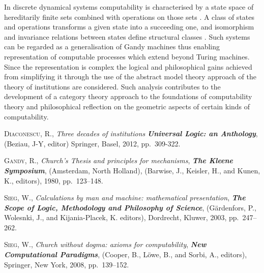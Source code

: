 \documentclass[bsl,meeting]{asl}
\begin{document}
\thispagestyle{empty}


In discrete dynamical systems computability is characterised by a state space of hereditarily finite sets combined with operations on those sets 
\cite{Sieg4}. A class of states and operations transforms a given state into a succeeding one, and isomorphism and invariance relations between 
states define structural classes \cite{Sieg3}. Such systems can be regarded as a generalisation of Gandy machines \cite{Gandy2} thus enabling 
representation of computable processes which extend beyond Turing machines. Since the representation is complex the logical and philosophical 
gains achieved from simplifying it through the use of the abstract model theory approach of the theory of institutions \cite{Diaconescu1} are 
considered. Such analysis contributes to the development of a category theory approach to the foundations of computability theory and 
philosophical reflection on the geometric aspects of certain kinds of computability.

\begin{thebibliography}{10}

{\scshape Diaconescu, R.},
{\itshape Three decades of institutions}
{\bfseries\itshape Universal Logic: an Anthology},
(Beziau, J-Y, editor)
Springer, Basel,
2012,
pp.~309-322.

{\scshape Gandy, R.},
{\itshape Church's Thesis and principles for mechanisms},
{\bfseries\itshape The Kleene Symposium},
(Amsterdam, North Holland),
(Barwise, J., Keisler, H., and Kunen, K., editors), 
1980,
pp.~123--148.

{\scshape Sieg, W.},
{\itshape Calculations by man and machine: mathematical presentation}, 
{\bfseries\itshape The Scope of Logic, Methodology and Philosophy of Science},
(G\"{a}rdenfors, P., Wolesnki, J., and Kijania-Placek, K. editors),
Dordrecht, Kluwer,
2003,
pp.~247--262.

{\scshape Sieg, W.},
{\itshape Church without dogma: axioms for computability},
{\bfseries\itshape New Computational Paradigms},
(Cooper, B., L\"{o}we, B., and Sorbi, A., editors),
Springer, New York,
2008,
pp.~139--152.

\end{thebibliography}

\vspace*{-0.5\baselineskip}
\end{document}
